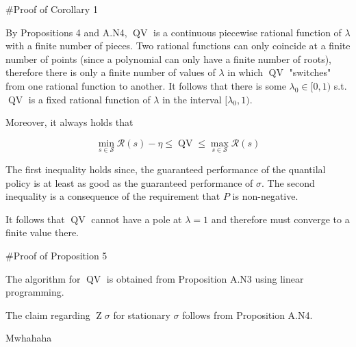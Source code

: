\documentclass[a4paper]{article}
\newcommand{\St}{\mathcal{S}}
\newcommand{\R}{\mathcal{R}}
\newcommand{\QV}{\operatorname{QV}}
\DeclareMathOperator{\Z}{Z}
\begin{document}
\#Proof of Corollary 1

By Propositions 4 and A.N4, $\QV$ is a continuous piecewise rational function of $\lambda$ with a finite number of pieces. Two rational functions can only coincide at a finite number of points (since a polynomial can only have a finite number of roots), therefore there is only a finite number of values of $\lambda$ in which $\QV$ "switches" from one rational function to another. It follows that there is some $\lambda_0\in[0,1)$ s.t. $\QV$ is a fixed rational function of $\lambda$ in the interval $[\lambda_0,1)$.

Moreover, it always holds that

$$\min_{s\in\St} \R(s) - \eta \leq \QV \leq \max_{s\in\St} \R(s)$$

The first inequality holds since, the guaranteed performance of the quantilal policy is at least as good as the guaranteed performance of $\sigma$. The second inequality is a consequence of the requirement that $P$ is non-negative.

It follows that $\QV$ cannot have a pole at $\lambda = 1$ and therefore must converge to a finite value there.

\#Proof of Proposition 5

The algorithm for $\QV$ is obtained from Proposition A.N3 using linear programming. 

The claim regarding $\Z\sigma$ for stationary $\sigma$ follows from Proposition A.N4.

Mwhahaha
\end{document}
